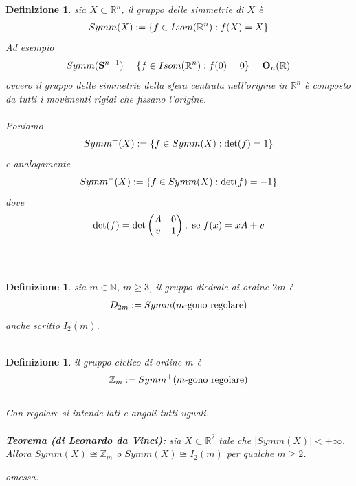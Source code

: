 \documentclass[oneside, 11pt]{amsbook}
\makeatletter
\newcommand{\0}{{(0)}}
\newcommand{\3}{{(3)}}
\theoremstyle{colonplain}
\theoremstyle{colondefinition}
\newtheorem{defn}[thm]{Definizione}
\theoremstyle{colonremark}
\numberwithin{equation}{chapter}
\renewcommand{\proofname}{Dimostrazione}
\renewenvironment{proof}[1][\proofname]{\par
  \pushQED{\qed}%
  \normalfont \topsep6\p@\@plus6\p@\relax
  \trivlist
  \item[\hskip\labelsep\bfseries #1:]\ignorespaces
}{%
  \popQED\endtrivlist\@endpefalse
}
\makeatother
\begin{document}
\begin{defn} sia $X \subset \mathbb{R}^n$, il \textit{gruppo delle simmetrie di $X$} è
\begin{align}
    Symm(X) := \{ f \in Isom(\mathbb{R}^n) : f(X) = X \} \notag
\end{align}
Ad esempio
\begin{align}
    Symm(\mathbf{S}^{n - 1}) = \{ f \in Isom(\mathbb{R}^n) : f(0) = 0 \} = \mathbf{O}_n(\mathbb{R}) \notag
\end{align}
ovvero il gruppo delle simmetrie della sfera centrata nell'origine in $\mathbb{R}^n$ è composto da tutti i movimenti rigidi che fissano l'origine. \\ \\
Poniamo
\begin{align}
    Symm^+(X) := \{ f \in Symm(X) : \det (f) = 1 \} \notag
\end{align}
e analogamente
\begin{align}
    Symm^-(X) := \{ f \in Symm(X) : \det (f) = -1 \} \notag
\end{align}
dove
\begin{align}
    \det (f) = \det \begin{pmatrix}
        A & 0 \\
        v & 1
    \end{pmatrix}, \text{ se } f(x) = xA + v \notag
\end{align} \\ \\
\end{defn}
\begin{defn} sia $m \in \mathbb{N}$, $m \geq 3$, il \textit{gruppo diedrale} di ordine $2m$ è
\begin{align}
    D_{2m} := Symm(m\text{-gono regolare}) \notag
\end{align}
anche scritto $I_2(m)$. \\ \\
\end{defn}
\begin{defn} il \textit{gruppo ciclico} di ordine $m$ è
\begin{align}
    \mathbb{Z}_m := Symm^+(m\text{-gono regolare}) \notag
\end{align} \\
Con regolare si intende lati e angoli tutti uguali. \\ \\
\textbf{Teorema (di Leonardo da Vinci):} sia $X \subset \mathbb{R}^2$ tale che $|Symm(X)| < +\infty$. Allora $Symm(X) \cong \mathbb{Z}_m$ o $Symm(X) \cong I_2(m)$ per qualche $m \geq 2$. \\

\begin{proof} omessa. \end{proof}
\end{defn}
\end{document}
